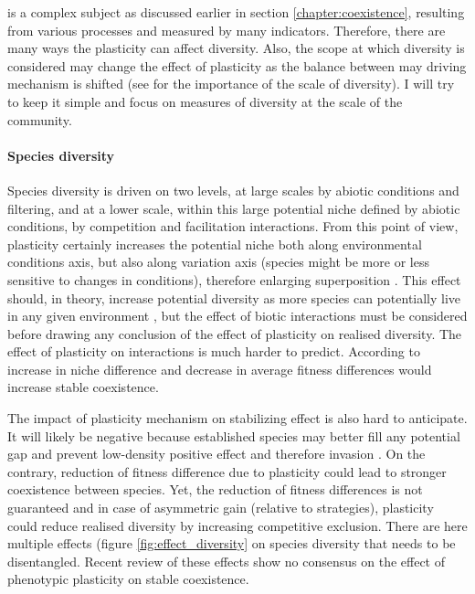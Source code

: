 { is a complex subject as discussed earlier in section \ref{chapter:coexistence}, resulting from various processes and measured by many indicators. Therefore, there are many ways the plasticity can affect diversity. Also, the scope at which diversity is considered may change the effect of plasticity as the balance between may driving mechanism is shifted (see \cite{chalmandrier_communities_2015} for the importance of the scale of diversity). I will try to keep it simple and focus on measures of diversity at the scale of the community.
\paragraph{Species diversity}

Species diversity is driven on two levels, at large scales by abiotic conditions and filtering, and at a lower scale, within this large potential niche defined by abiotic conditions, by competition and facilitation interactions. From this point of view, plasticity certainly increases the potential niche both along environmental conditions axis, but also along variation axis (species might be more or less sensitive to changes in conditions), therefore enlarging  superposition \parencite{violle_return_2012}. This effect should, in theory, increase potential diversity as more species can potentially live in any given environment \parencite{lepik_high_2005, jung_intraspecific_2014}, but the effect of biotic interactions must be considered before drawing any conclusion of the effect of plasticity on realised diversity. The effect of plasticity on interactions is much harder to predict. According to \cite{adler_coexistence_2007} increase in niche difference and decrease in average fitness differences would increase stable coexistence.

The impact of plasticity mechanism on stabilizing effect is also hard to anticipate. It will likely be negative because established species may better fill any potential gap and prevent low-density positive effect and therefore invasion \parencite{berg_trait_2010}. On the contrary, reduction of fitness difference due to plasticity could lead to stronger coexistence between species. Yet, the reduction of fitness differences is not guaranteed and in case of asymmetric gain (relative to strategies), plasticity could reduce realised diversity by increasing competitive exclusion.
There are here multiple effects (figure \ref{fig:effect_diversity} on species diversity that needs to be disentangled. Recent review \parencite{turcotte_phenotypic_2016} of these effects show no consensus on the effect of phenotypic plasticity on stable coexistence.

}
